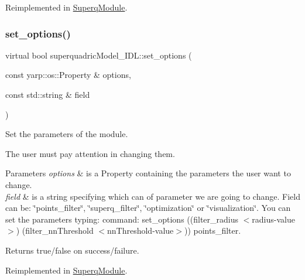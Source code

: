 Reimplemented in \mbox{\hyperlink{classSuperqModule_a89be4778051c4dd19339021448f89b41}{Superq\+Module}}.

\mbox{\label{classsuperquadricModel__IDL_a575e0b591f07206b0d6c29e5cfeead37}} 
\subsubsection{\texorpdfstring{set\+\_\+options()}{set\_options()}}
{\footnotesize\ttfamily virtual bool superquadric\+Model\+\_\+\+I\+D\+L\+::set\+\_\+options (\begin{DoxyParamCaption}\item[{const yarp\+::os\+::\+Property \&}]{options,  }\item[{const std\+::string \&}]{field }\end{DoxyParamCaption})\hspace{0.3cm}{\ttfamily [virtual]}}



Set the parameters of the module. 

The user must pay attention in changing them. 
\begin{DoxyParams}{Parameters}
{\em options} & is a Property containing the parameters the user want to change. \\
\hline
{\em field} & is a string specifying which can of parameter we are going to change. Field can be\+: \char`\"{}points\+\_\+filter\char`\"{}, \char`\"{}superq\+\_\+filter\char`\"{}, \char`\"{}optimization\char`\"{} or \char`\"{}visualization\char`\"{}. You can set the parameters typing\+: command\+: set\+\_\+options ((filter\+\_\+radius $<$radius-\/value$>$) (filter\+\_\+nn\+Threshold $<$nn\+Threshold-\/value$>$)) points\+\_\+filter. \\
\hline
\end{DoxyParams}
\begin{DoxyReturn}{Returns}
true/false on success/failure. 
\end{DoxyReturn}


Reimplemented in \mbox{\hyperlink{classSuperqModule_a32ccf59ac0572ca77883237dd2d12890}{Superq\+Module}}.

\mbox{\label{classsuperquadricModel__IDL_a1a2080d797a81b46b0dffa86b5367e15}} 
